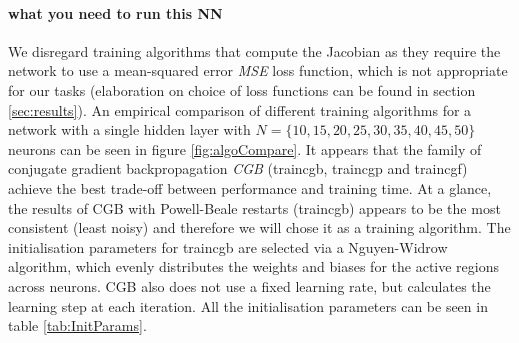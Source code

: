 \documentclass[11pt,a4paper]{article}
\begin{document}
\paragraph{what you need to run this NN}
We disregard training algorithms that compute the Jacobian as they require the network to use a mean-squared error \textit{MSE} loss function, which is not appropriate for our tasks (elaboration on choice of loss functions can be found in section \ref{sec:results}). An empirical comparison of different training algorithms for a network with a single hidden layer with \(N = \{10,15,20,25,30,35,40,45,50\}\) neurons can be seen in figure \ref{fig:algoCompare}. It appears that the family of conjugate gradient backpropagation \textit{CGB} (traincgb, traincgp and traincgf) achieve the best trade-off between performance and training time. At a glance, the results of CGB with Powell-Beale restarts (traincgb) appears to be the most consistent (least noisy) and therefore we will chose it as a training algorithm. The initialisation parameters for traincgb are selected via a Nguyen-Widrow \autocite{NetParamInit} algorithm, which evenly distributes the weights and biases for the active regions across neurons. CGB also does not use a fixed learning rate, but calculates the learning step at each iteration. All the initialisation parameters can be seen in table \ref{tab:InitParams}.
\end{document}
